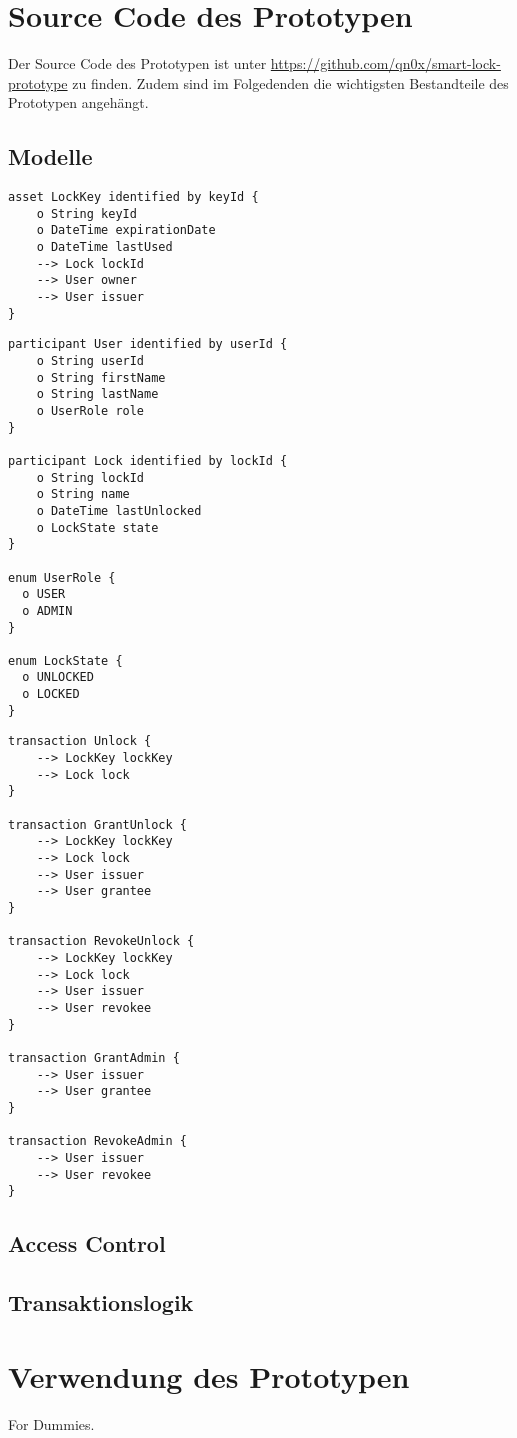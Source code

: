 \section{Source Code des Prototypen}
    Der Source Code des Prototypen ist unter \sloppy\url{https://github.com/qn0x/smart-lock-prototype} zu finden. 
    Zudem sind im Folgedenden die wichtigsten Bestandteile des Prototypen angehängt.
    
    \subsection{Modelle}
        \begin{lstlisting}[caption={Assets},label=model_assets,captionpos=b]
asset LockKey identified by keyId {
    o String keyId
    o DateTime expirationDate
    o DateTime lastUsed
    --> Lock lockId
    --> User owner
    --> User issuer
}
        \end{lstlisting}
        \vspace{1em}
        \begin{lstlisting}[caption={Participants},label=model_participants,captionpos=b]
participant User identified by userId {
    o String userId
    o String firstName
    o String lastName
    o UserRole role
}

participant Lock identified by lockId {
    o String lockId
    o String name
    o DateTime lastUnlocked
    o LockState state
}

enum UserRole {
  o USER
  o ADMIN
}

enum LockState {
  o UNLOCKED
  o LOCKED
}
        \end{lstlisting}
        \vspace{1em}
        \begin{lstlisting}[caption={Transactions},label=model_transactopms,captionpos=b]
transaction Unlock {
    --> LockKey lockKey
    --> Lock lock
}

transaction GrantUnlock {
    --> LockKey lockKey
    --> Lock lock
    --> User issuer
    --> User grantee
}

transaction RevokeUnlock {
    --> LockKey lockKey
    --> Lock lock
    --> User issuer
    --> User revokee
}

transaction GrantAdmin {
    --> User issuer
    --> User grantee
}

transaction RevokeAdmin {
    --> User issuer
    --> User revokee
}
        \end{lstlisting}
    
    \subsection{Access Control}
    \subsection{Transaktionslogik}
\newpage
\section{Verwendung des Prototypen}
    For Dummies. 
